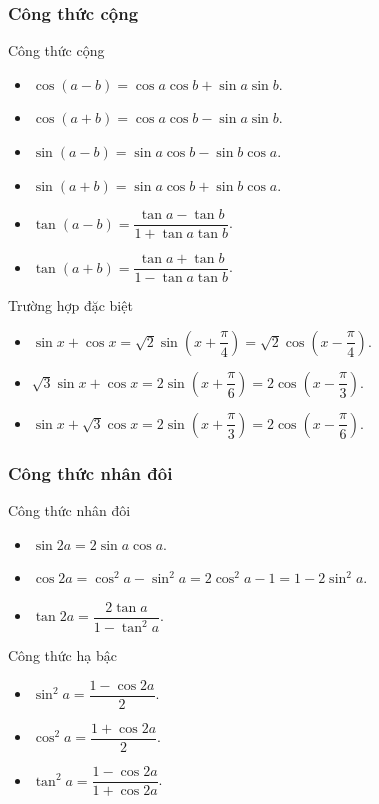 \subsubsection{Công thức cộng}
\begin{khung4}{Công thức cộng}
	\begin{multicols}{2}
	\begin{itemize}
		\item $\cos (a-b) = \cos a \cos b + \sin a\sin b$.
		\item $\cos (a+b) = \cos a \cos b - \sin a\sin b$.
		\item $\sin (a-b) = \sin a \cos b - \sin b \cos a$.
		\item $\sin (a+b) = \sin a \cos b + \sin b \cos a$.
		\item $\tan (a-b) = \dfrac{\tan a - \tan b}{1+\tan a \tan b}$.
		\item $\tan (a+b) = \dfrac{\tan a + \tan b}{1-\tan a \tan b}$.
	\end{itemize}
\end{multicols}
\end{khung4}
\begin{khung4}{Trường hợp đặc biệt}
	\begin{itemize}
		\item $\sin x + \cos x = \sqrt{2}\sin\left(x+\dfrac{\pi}{4}\right) = \sqrt{2}\cos \left(x-\dfrac{\pi}{4}\right)$.
		\item $\sqrt{3}\sin x + \cos x = 2\sin \left(x+\dfrac{\pi}{6}\right) = 2\cos \left(x-\dfrac{\pi}{3}\right)$.
		\item $\sin x + \sqrt{3}\cos x = 2\sin \left(x+ \dfrac{\pi}{3}\right) = 2\cos \left(x-\dfrac{\pi}{6}\right)$.
	\end{itemize}
\end{khung4}
\subsubsection{Công thức nhân đôi}
\begin{multicols}{2}
	\begin{khung4}{Công thức nhân đôi}
		\begin{itemize}
			\item $\sin 2a = 2\sin a \cos a$.
			\item $\cos 2a = \cos^2a-\sin^2a = 2\cos^2a-1 = 1-2\sin^2a$.
			\item $\tan 2a = \dfrac{2\tan a}{1-\tan^2a}$.
		\end{itemize}
	\end{khung4}
	\begin{khung4}{Công thức hạ bậc}
		\begin{itemize}
			\item $\sin^2a= \dfrac{1-\cos 2a}{2}$.
			\item $\cos^2a = \dfrac{1+\cos 2a}{2}$.
			\item $\tan^2a=\dfrac{1-\cos2a}{1+\cos 2a}$.
		\end{itemize}
	\end{khung4}
\end{multicols}

